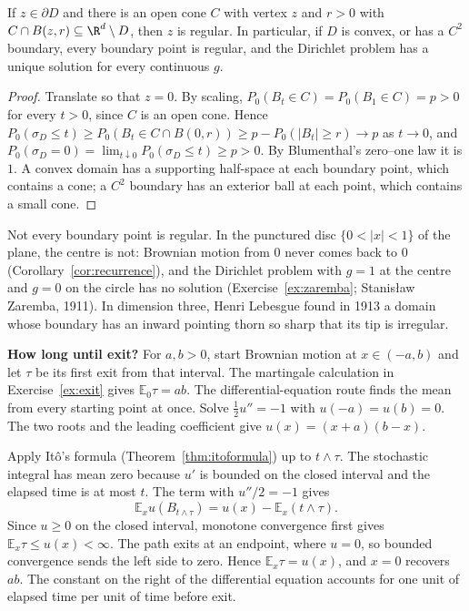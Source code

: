 \begin{theorem}\label{thm:cone}
If $z\in\partial D$ and there is an open cone $C$ with vertex $z$ and $r>0$ with $C\cap B(z,r)\subseteq\R^d\setminus D$, then $z$ is regular. In particular, if $D$ is convex, or has a $C^2$ boundary, every boundary point
is regular, and the Dirichlet problem has a unique solution for every continuous $g$.
\end{theorem}

\begin{proof}
Translate so that $z=0$. By scaling, $P_0(B_t\in C)=P_0(B_1\in C)=p>0$ for every $t>0$, since $C$ is an open cone. Hence $P_0(\sigma_D\le t)\ge P_0(B_t\in C\cap B(0,r))\ge p-P_0(|B_t|\ge r)\to p$ as $t\to0$, and
$P_0(\sigma_D=0)=\lim_{t\downarrow0}P_0(\sigma_D\le t)\ge p>0$. By Blumenthal's zero--one law it is $1$. A convex domain has a supporting half-space at each boundary point, which contains a cone; a $C^2$ boundary has an
exterior ball at each point, which contains a small cone.
\end{proof}

Not every boundary point is regular. In the punctured disc $\{0<|x|<1\}$ of the plane, the centre is not: Brownian motion from $0$ never comes back to $0$ (Corollary~\ref{cor:recurrence}), and the Dirichlet problem with
$g=1$ at the centre and $g=0$ on the circle has no solution (Exercise~\ref{ex:zaremba}; Stanis\l aw Zaremba, 1911). In dimension three, Henri Lebesgue found in 1913 a domain whose boundary has an inward
pointing thorn so sharp that its tip is irregular.

\textbf{How long until exit?} For $a,b>0$, start Brownian motion at $x\in(-a,b)$ and let $\tau$ be its first exit from that interval. The martingale calculation in Exercise~\ref{ex:exit} gives $\mathbb E_0\tau=ab$. The differential-equation route finds the mean from every starting point at once. Solve $\tfrac12u''=-1$ with $u(-a)=u(b)=0$. The two roots and the leading coefficient give $u(x)=(x+a)(b-x)$.

Apply It\^o's formula (Theorem~\ref{thm:itoformula}) up to $t\wedge\tau$. The stochastic integral has mean zero because $u'$ is bounded on the closed interval and the elapsed time is at most $t$. The term with $u''/2=-1$ gives
\[
\mathbb E_x u(B_{t\wedge\tau})=u(x)-\mathbb E_x(t\wedge\tau).
\]
Since $u\ge0$ on the closed interval, monotone convergence first gives $\mathbb E_x\tau\le u(x)<\infty$. The path exits at an endpoint, where $u=0$, so bounded convergence sends the left side to zero. Hence $\mathbb E_x\tau=u(x)$, and $x=0$ recovers $ab$. The constant on the right of the differential equation accounts for one unit of elapsed time per unit of time before exit.

